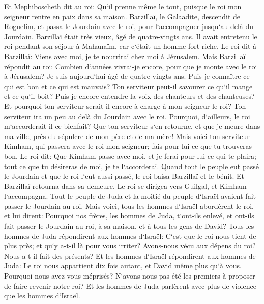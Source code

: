 \verse Et Mephiboscheth dit au roi: Qu`il prenne même le tout, puisque le roi mon seigneur rentre en paix dans sa maison. 
\verse Barzillaï, le Galaadite, descendit de Roguelim, et passa le Jourdain avec le roi, pour l`accompagner jusqu`au delà du Jourdain. 
\verse Barzillaï était très vieux, âgé de quatre-vingts ans. Il avait entretenu le roi pendant son séjour à Mahanaïm, car c`était un homme fort riche. 
\verse Le roi dit à Barzillaï: Viens avec moi, je te nourrirai chez moi à Jérusalem. 
\verse Mais Barzillaï répondit au roi: Combien d`années vivrai-je encore, pour que je monte avec le roi à Jérusalem? 
\verse Je suis aujourd`hui âgé de quatre-vingts ans. Puis-je connaître ce qui est bon et ce qui est mauvais? Ton serviteur peut-il savourer ce qu`il mange et ce qu`il boit? Puis-je encore entendre la voix des chanteurs et des chanteuses? Et pourquoi ton serviteur serait-il encore à charge à mon seigneur le roi? 
\verse Ton serviteur ira un peu au delà du Jourdain avec le roi. Pourquoi, d`ailleurs, le roi m`accorderait-il ce bienfait? 
\verse Que ton serviteur s`en retourne, et que je meure dans ma ville, près du sépulcre de mon père et de ma mère! Mais voici ton serviteur Kimham, qui passera avec le roi mon seigneur; fais pour lui ce que tu trouveras bon. 
\verse Le roi dit: Que Kimham passe avec moi, et je ferai pour lui ce qui te plaira; tout ce que tu désireras de moi, je te l`accorderai. 
\verse Quand tout le peuple eut passé le Jourdain et que le roi l`eut aussi passé, le roi baisa Barzillaï et le bénit. Et Barzillaï retourna dans sa demeure. 
\verse Le roi se dirigea vers Guilgal, et Kimham l`accompagna. Tout le peuple de Juda et la moitié du peuple d`Israël avaient fait passer le Jourdain au roi. 
\verse Mais voici, tous les hommes d`Israël abordèrent le roi, et lui dirent: Pourquoi nos frères, les hommes de Juda, t`ont-ils enlevé, et ont-ils fait passer le Jourdain au roi, à sa maison, et à tous les gens de David? 
\verse Tous les hommes de Juda répondirent aux hommes d`Israël: C`est que le roi nous tient de plus près; et qu`y a-t-il là pour vous irriter? Avons-nous vécu aux dépens du roi? Nous a-t-il fait des présents? 
\verse Et les hommes d`Israël répondirent aux hommes de Juda: Le roi nous appartient dix fois autant, et David même plus qu`à vous. Pourquoi nous avez-vous méprisés? N`avons-nous pas été les premiers à proposer de faire revenir notre roi? Et les hommes de Juda parlèrent avec plus de violence que les hommes d`Israël. 


